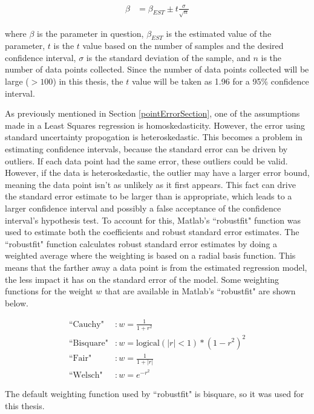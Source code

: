\documentclass[12pt]{ucthesis}
\begin{document}
\begin{align}
\label{confidenceInterval}
\beta &= \beta_{EST} \pm t\frac{\sigma}{\sqrt{n}}
\end{align}

where $\beta$ is the parameter in question, $\beta_{EST}$ is the estimated value of the parameter, $t$ is the $t$ value based on the number of samples and the desired confidence interval, $\sigma$ is the standard deviation of the sample, and $n$ is the number of data points collected. Since  the number of data points collected will be large ($>100$) in this thesis, the $t$ value will be taken as 1.96 for a 95\% confidence interval.

\indent

As previously mentioned in Section \ref{pointErrorSection}, one of the assumptions made in a Least Squares regression is homoskedasticity. However, the error using standard uncertainty propogation is heteroskedastic. This becomes a problem in estimating confidence intervals, because the standard error can be driven by outliers. If each data point had the same error, these outliers could be valid. However, if the data is heteroskedastic, the outlier may have a larger error bound, meaning the data point isn't as unlikely as it first appears. This fact can drive the standard error estimate to be larger than is appropriate, which leads to a larger confidence interval and possibly a false acceptance of the confidence interval's hypothesis test. To account for this, Matlab's ``robustfit" function was used to estimate both the coefficients and robust standard error estimates. The ``robustfit" function calculates robust standard error estimates by doing a weighted average where the weighting is based on a radial basis function. This means that the farther away a data point is from the estimated regression model, the less impact it has on the standard error of the model. Some weighting functions for the weight $w$ that are available in Matlab's ``robustfit" are shown below.

\begin{align}
\text{``Cauchy"} &: w = \frac{1}{1+r^2}\\
\text{``Bisquare"} &: w = \text{logical}(|r|<1)*(1-r^2)^2\\
\text{``Fair"} &: w =\frac{1}{1+|r|}\\
\text{``Welsch"} &: w = e^{-r^2}
\end{align}

The default weighting function used by ``robustfit" is bisquare, so it was used for this thesis.
\end{document}
